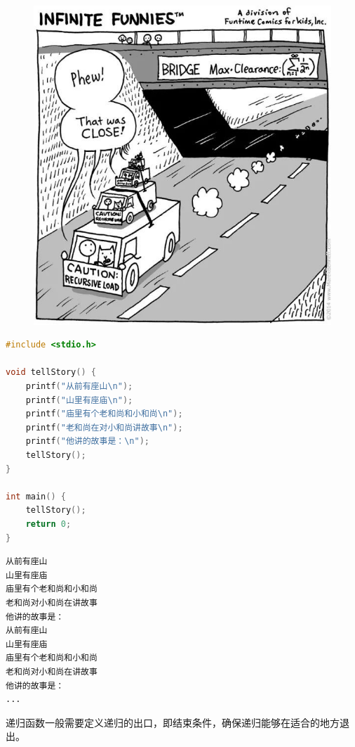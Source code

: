 \begin{figure}[H]
	\centering
	\includegraphics[scale=0.6]{img/Chapter5/5-3/5.png}
\end{figure}


\begin{lstlisting}[language=C]
#include <stdio.h>

void tellStory() {
	printf("从前有座山\n");
	printf("山里有座庙\n");
	printf("庙里有个老和尚和小和尚\n");
	printf("老和尚在对小和尚讲故事\n");
	printf("他讲的故事是：\n");
	tellStory();
}

int main() {
	tellStory();
	return 0;
}
\end{lstlisting}

\begin{tcolorbox}
	\begin{verbatim}
从前有座山
山里有座庙
庙里有个老和尚和小和尚
老和尚对小和尚在讲故事
他讲的故事是：
从前有座山
山里有座庙
庙里有个老和尚和小和尚
老和尚对小和尚在讲故事
他讲的故事是：
...
	\end{verbatim}
\end{tcolorbox}

递归函数一般需要定义递归的出口，即结束条件，确保递归能够在适合的地方退出。\\

